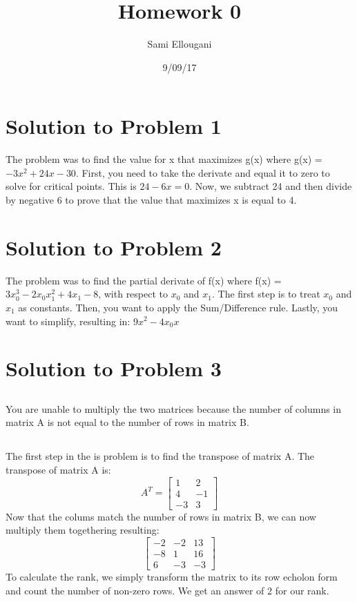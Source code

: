 \documentclass[a4paper]{article}
\title{Homework 0}
\author{Sami Ellougani}
\date{9/09/17}
\begin{document}
\lstset{language=Python}

\maketitle

\section{Solution to Problem 1}
The problem was to find the value for x that maximizes g(x) where g(x) = $-3x^2 + 24x - 30$. First, you need to 
take the derivate and equal it to zero to solve for critical points. This is $24-6x = 0$. Now, we subtract 24 and then divide by negative
6 to prove that the value that maximizes x is equal to 4.

\section{Solution to Problem 2}
The problem was to find the partial derivate of f(x) where f(x) = $3x_0^3 - 2x_0x_1^2 + 4x_1 - 8$, with respect to $x_0$ and $x_1$. The first step
is to treat $x_0$ and $x_1$ as constants. Then, you want to apply the Sum/Difference rule. Lastly, you want to simplify, resulting in:
$9x^2-4x_0x$

\section{Solution to Problem 3}
\subsection{} 
You are unable to multiply the two matrices because the number of columns in matrix A is not equal to the number of rows in matrix B.
\subsection{}
The first step in the is problem is to find the transpose of matrix A. The transpose of matrix A is:
\[
A^T=
  \begin{bmatrix}
    1 & 2  \\
    4 & -1 \\
   -3 & 3
  \end{bmatrix}
\]
Now that the colums match the number of rows in matrix B, we can now multiply them togethering resulting:
\[
  \begin{bmatrix}
    -2 & -2 & 13 \\
    -8 & 1 & 16 \\
    6 & -3 & -3
  \end{bmatrix}
\]
To calculate the rank, we simply transform the matrix to its row echolon form and count the number of non-zero rows. We get an answer of 2 for our rank.
\end{document}
